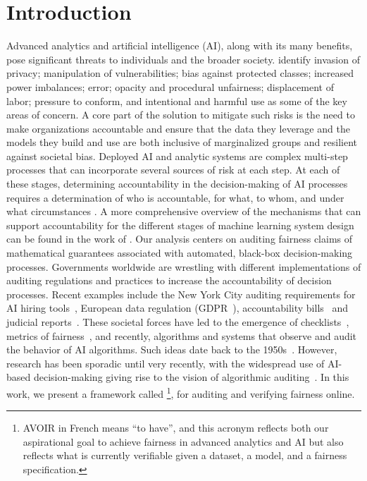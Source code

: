 \section{Introduction}

Advanced analytics and artificial intelligence (AI), along with its many benefits, pose significant threats to individuals and the broader society.
\cite{Hirsch20} identify invasion of privacy; manipulation of vulnerabilities;  bias against protected classes; increased power imbalances;  error; opacity and procedural unfairness; displacement of labor;  pressure to conform, and intentional and harmful use as some of the key areas of concern.
A core part of the solution to mitigate such risks is the need to make organizations accountable and ensure that the data they leverage and the models they build and use are both inclusive of marginalized groups and resilient against societal bias.
Deployed AI and analytic systems are complex multi-step processes that can incorporate several sources of risk at each step.
At each of these stages, determining accountability in the decision-making of AI processes requires a determination of who is accountable, for what, to whom, and under what circumstances \citep{nissenbaum1996accountability,cooper2022accountability}. 
A more comprehensive overview of the mechanisms that can support accountability for the different stages of machine learning system design can be found in the work of \citet{cooper2022accountability}.
Our analysis centers on auditing fairness claims of mathematical guarantees associated with automated, black-box decision-making processes.
Governments worldwide are wrestling with different implementations of auditing regulations and practices to increase the accountability of decision processes.
Recent examples include the New York City auditing requirements for AI hiring tools~\citep{vanderford2022nybiaslaw}, European data regulation (GDPR~\citep{GDPR}), accountability bills~\citep{congress2023hr,algtransparency2022} and judicial reports~\citep{justice2018free}.
These societal forces have led to the emergence of checklists~\citep{mitchell2019model,sokol2020explainability}, metrics of fairness~\citep{verma2018fairness}, and recently, algorithms and systems that observe and audit the behavior of AI algorithms.
Such ideas date back to the 1950s~\citep{Moore1956}.
However, research has been sporadic until very recently, with the widespread use of AI-based decision-making giving rise to the vision of algorithmic auditing~\citep{Clavell20}.
In this work, we present a framework called \AVOIRmethodname{}\footnote{AVOIR in French means ``to have'', and this acronym reflects both our aspirational goal to achieve fairness in advanced analytics and AI but also reflects what is currently verifiable given a dataset, a model, and a fairness specification.}, for auditing and verifying fairness online.
